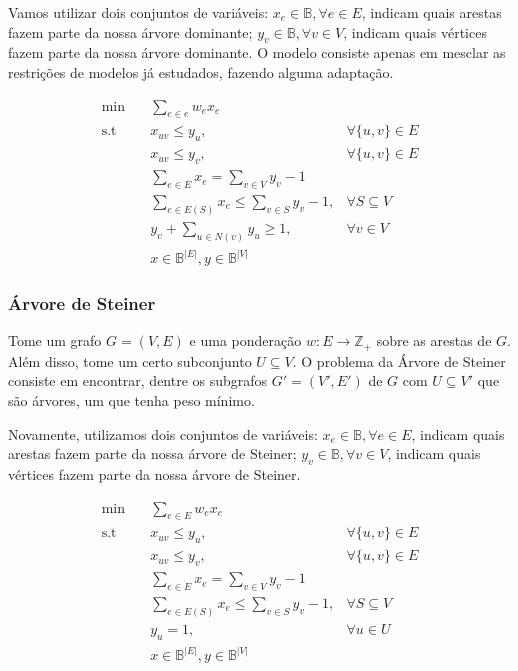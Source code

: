 \documentclass[]{article}
\numberwithin{equation}{section}
\begin{document}
Vamos utilizar dois conjuntos de variáveis: $x_e \in \mathbb{B}, \forall e \in E$, indicam quais
arestas fazem parte da nossa árvore dominante; $y_v \in \mathbb{B}, \forall v \in V$, indicam quais
vértices fazem parte da nossa árvore dominante.
O modelo consiste apenas em mesclar as restrições de modelos já estudados, fazendo alguma adaptação.

\begin{align}
\min        &\quad  \sum_{e \in e} w_ex_e \\
\text{s.t}  &\quad  x_{uv} \leq y_u, & \forall \{u, v\} \in E \\
            &\quad  x_{uv} \leq y_v, & \forall \{u, v\} \in E \\
            &\quad  \sum_{e \in E} x_e = \sum_{v \in V} y_v - 1 \\
            &\quad  \sum_{e \in E(S)} x_e \leq \sum_{v \in S} y_v - 1, & \forall S \subseteq V \\
            &\quad  y_v + \sum_{u \in N(v)} y_u \geq 1, & \forall v \in V \\
            &\quad  x \in \mathbb{B}^{|E|}, y \in \mathbb{B}^{|V|}
\end{align}

\subsubsection{Árvore de Steiner}

Tome um grafo $G = (V, E)$ e uma ponderação $w : E \to \mathbb{Z}_+$ sobre as arestas de $G$.
Além disso, tome um certo subconjunto $U \subseteq V$.
O problema da Árvore de Steiner consiste em encontrar, dentre os subgrafos $G' = (V', E')$ de $G$ com
$U \subseteq V'$ que são árvores, um que tenha peso mínimo.

Novamente, utilizamos dois conjuntos de variáveis: $x_e \in \mathbb{B}, \forall e \in E$, indicam
quais arestas fazem parte da nossa árvore de Steiner; $y_v \in \mathbb{B}, \forall v \in V$, indicam
quais vértices fazem parte da nossa árvore de Steiner.

\begin{align}
\min        &\quad  \sum_{e \in E} w_ex_e \\
\text{s.t}  &\quad  x_{uv} \leq y_u, & \forall \{u, v\} \in E \\
            &\quad  x_{uv} \leq y_v, & \forall \{u, v\} \in E \\
            &\quad  \sum_{e \in E} x_e = \sum_{v \in V} y_v - 1 \\
            &\quad  \sum_{e \in E(S)} x_e \leq \sum_{v \in S} y_v - 1, & \forall S \subseteq V \\
            &\quad  y_u = 1, & \forall u \in U \\
            &\quad  x \in \mathbb{B}^{|E|}, y \in \mathbb{B}^{|V|}
\end{align}
\end{document}
